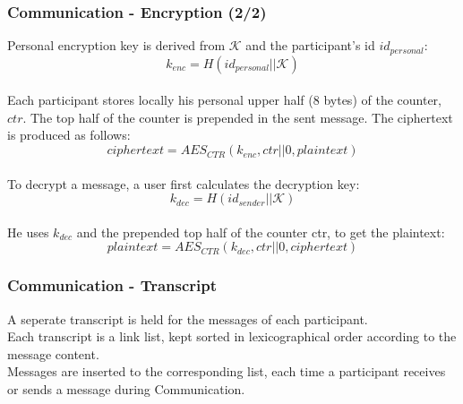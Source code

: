 \begin{frame}
  \frametitle{Communication - Encryption (2/2)}
Personal encryption key is derived from $\mathcal{K}$ and the participant's id $id_{personal}$:
\[ k_{enc} = H(id_{personal} || \mathcal{K}) \]\\[0.3cm]

  Each participant stores locally his personal upper half (8 bytes) of the counter, $ctr$. The top half of the counter is prepended in the sent message. The ciphertext is produced as follows:
\[ ciphertext = AES_{CTR}(k_{enc}, ctr||0, plaintext) \]\\[0.3cm] 
  
  To decrypt a message, a user first calculates the decryption key:
  \[ k_{dec} = H(id_{sender} || \mathcal{K}) \]\\[0.3cm]

  He uses $k_{dec}$ and the prepended top half of the counter ctr, to get the plaintext:
  \[ plaintext = AES_{CTR}(k_{dec}, ctr||0, ciphertext) \]
\end{frame}

\begin{frame}
  \frametitle{Communication - Transcript}
  A seperate transcript is held for the messages of each participant.\\[0.3cm]
  
  Each transcript is a link list, kept sorted in lexicographical order according to the message content.\\[0.3cm]
  
  Messages are inserted to the corresponding list, each time a participant receives or sends a message during Communication.
\end{frame}
